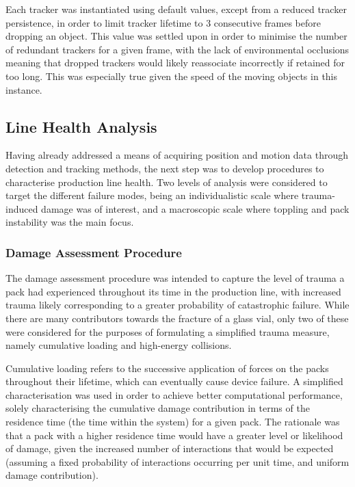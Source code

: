 \documentclass[10pt]{article}
\begin{document}
\noindent Each tracker was instantiated using default values, except from a reduced tracker persistence, in order to limit tracker lifetime to 3 consecutive frames before dropping an object. This value was settled upon in order to minimise the number of redundant trackers for a given frame, with the lack of environmental occlusions meaning that dropped trackers would likely reassociate incorrectly if retained for too long. This was especially true given the speed of the moving objects in this instance.

\subsection{Line Health Analysis}
Having already addressed a means of acquiring position and motion data through detection and tracking methods, the next step was to develop procedures to characterise production line health. Two levels of analysis were considered to target the different failure modes, being an individualistic scale where trauma-induced damage was of interest, and a macroscopic scale where toppling and pack instability was the main focus.

\subsubsection{Damage Assessment Procedure}
The damage assessment procedure was intended to capture the level of trauma a pack had experienced throughout its time in the production line, with increased trauma likely corresponding to a greater probability of catastrophic failure. While there are many contributors towards the fracture of a glass vial, only two of these were considered for the purposes of formulating a simplified trauma measure, namely cumulative loading and high-energy collisions. 

Cumulative loading refers to the successive application of forces on the packs throughout their lifetime, which can eventually cause device failure. A simplified characterisation was used in order to achieve better computational performance, solely characterising the cumulative damage contribution in terms of the residence time (the time within the system) for a given pack. The rationale was that a pack with a higher residence time would have a greater level or likelihood of damage, given the increased number of interactions that would be expected (assuming a fixed probability of interactions occurring per unit time, and uniform damage contribution).
\end{document}
